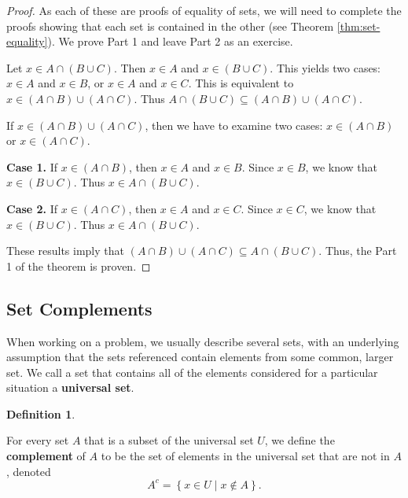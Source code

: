 \documentclass[
]{book}
\theoremstyle{definition}
\newtheorem{definition}{Definition}[chapter]
\theoremstyle{definition}
\theoremstyle{definition}
\theoremstyle{definition}
\theoremstyle{remark}
\begin{document}
\begin{proof}

As each of these are proofs of equality of sets, we will need to complete the proofs showing that each set is contained in the other (see Theorem \ref{thm:set-equality}). We prove Part 1 and leave Part 2 as an exercise.

Let \(x\in A \cap (B \cup C)\). Then \(x\in A\) and \(x\in (B\cup C)\). This yields two cases: \(x\in A\) and \(x\in B\), or \(x\in A\) and \(x\in C\). This is equivalent to \(x \in (A\cap B) \cup (A\cap C)\). Thus \(A \cap (B \cup C) \subseteq (A \cap B) \cup (A \cap C)\).

If \(x\in (A \cap B) \cup (A \cap C)\), then we have to examine two cases: \(x\in (A\cap B)\) or \(x\in (A \cap C)\).

\textbf{Case 1.} If \(x\in (A\cap B)\), then \(x\in A\) and \(x\in B\). Since \(x\in B\), we know that \(x\in (B\cup C)\). Thus \(x\in A \cap (B\cup C)\).

\textbf{Case 2.} If \(x \in (A\cap C)\), then \(x\in A\) and \(x\in C\). Since \(x\in C\), we know that \(x \in (B\cup C)\). Thus \(x \in A \cap (B\cup C)\).

These results imply that \((A \cap B) \cup (A \cap C) \subseteq A \cap (B \cup C)\). Thus, the Part 1 of the theorem is proven.

\end{proof}

\hypertarget{set-complements}{%
\subsection{Set Complements}\label{set-complements}}

When working on a problem, we usually describe several sets, with an underlying assumption that the sets referenced contain elements from some common, larger set. We call a set that contains all of the elements considered for a particular situation a \textbf{universal set}.

\begin{definition}
\protect\hypertarget{def:set-complement}{}\label{def:set-complement}

For every set \(A\) that is a subset of the universal set \(U\), we define the \textbf{complement} of \(A\) to be the set of elements in the universal set that are not in \(A\), denoted
\[A^c=\left\{ x\in U \middle \vert x \notin A\right\}.\]

\end{definition}
\end{document}
